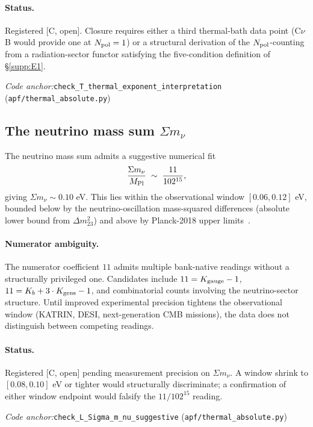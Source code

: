 \documentclass[11pt]{article}
\theoremstyle{plain}
\theoremstyle{definition}
\theoremstyle{remark}
\newcommand{\Mpl}{M_{\rm Pl}}
\newcommand{\coderef}[2]{\par\noindent\textit{Code anchor:}\quad\texttt{#1} (\texttt{#2})}
\begin{document}
\paragraph{Status.}  Registered [C, open].  Closure requires either a third thermal-bath data point (C$\nu$B would provide one at $N_{\rm pol} = 1$) or a structural derivation of the $N_{\rm pol}$-counting from a radiation-sector functor satisfying the five-condition definition of \S\ref{supp:E1}.

\coderef{check\_T\_thermal\_exponent\_interpretation}{apf/thermal\_absolute.py}

\bigskip

\subsection{The neutrino mass sum \texorpdfstring{$\Sigma m_\nu$}{Sigma m\_nu}}\label{supp:J2}

The neutrino mass sum admits a suggestive numerical fit
\[
  \frac{\Sigma m_\nu}{\Mpl} \;\sim\; \frac{11}{102^{15}},
\]
giving $\Sigma m_\nu \sim 0.10$ eV.  This lies within the observational window $[0.06, 0.12]$ eV, bounded below by the neutrino-oscillation mass-squared differences (absolute lower bound from $\Delta m^2_{23}$) and above by Planck-2018 upper limits~\cite{Planck2018}.

\paragraph{Numerator ambiguity.}  The numerator coefficient $11$ admits multiple bank-native readings without a structurally privileged one.  Candidates include $11 = K_{\rm gauge} - 1$, $11 = K_b + 3 \cdot K_{\rm gens} - 1$, and combinatorial counts involving the neutrino-sector structure.  Until improved experimental precision tightens the observational window (KATRIN, DESI, next-generation CMB missions), the data does not distinguish between competing readings.

\paragraph{Status.}  Registered [C, open] pending measurement precision on $\Sigma m_\nu$.  A window shrink to $[0.08, 0.10]$ eV or tighter would structurally discriminate; a confirmation of either window endpoint would falsify the $11/102^{15}$ reading.

\coderef{check\_L\_Sigma\_m\_nu\_suggestive}{apf/thermal\_absolute.py}
\end{document}
